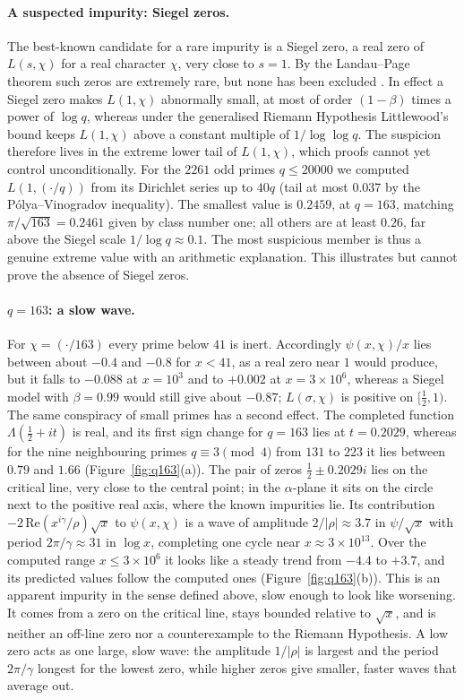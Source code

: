\documentclass[11pt,a4paper]{article}
\theoremstyle{definition}\newtheorem{definition}[proposition]{Definition}
\theoremstyle{remark}\newtheorem{remark}[proposition]{Remark}
\begin{document}
\paragraph{A suspected impurity: Siegel zeros.} The best-known candidate for a rare impurity is a Siegel zero, a real zero of $L(s,\chi)$ for a real character $\chi$, very close to $s=1$. By the Landau--Page theorem such zeros are extremely rare, but none has been excluded \cite{Davenport2000}. In effect a Siegel zero makes $L(1,\chi)$ abnormally small, at most of order $(1-\beta)$ times a power of $\log q$, whereas under the generalised Riemann Hypothesis Littlewood's bound keeps $L(1,\chi)$ above a constant multiple of $1/\log\log q$. The suspicion therefore lives in the extreme lower tail of $L(1,\chi)$, which proofs cannot yet control unconditionally. For the $2261$ odd primes $q\le20000$ we computed $L(1,(\cdot/q))$ from its Dirichlet series up to $40q$ (tail at most $0.037$ by the P\'olya--Vinogradov inequality). The smallest value is $0.2459$, at $q=163$, matching $\pi/\sqrt{163}=0.2461$ given by class number one; all others are at least $0.26$, far above the Siegel scale $1/\log q\approx0.1$. The most suspicious member is thus a genuine extreme value with an arithmetic explanation. This illustrates but cannot prove the absence of Siegel zeros.

\paragraph{$q=163$: a slow wave.} For $\chi=(\cdot/163)$ every prime below $41$ is inert. Accordingly $\psi(x,\chi)/x$ lies between about $-0.4$ and $-0.8$ for $x<41$, as a real zero near $1$ would produce, but it falls to $-0.088$ at $x=10^3$ and to $+0.002$ at $x=3\times10^6$, whereas a Siegel model with $\beta=0.99$ would still give about $-0.87$; $L(\sigma,\chi)$ is positive on $[\tfrac12,1)$. The same conspiracy of small primes has a second effect. The completed function $\Lambda(\frac12+it)$ is real, and its first sign change for $q=163$ lies at $t=0.2029$, whereas for the nine neighbouring primes $q\equiv3\pmod4$ from $131$ to $223$ it lies between $0.79$ and $1.66$ (Figure~\ref{fig:q163}(a)). The pair of zeros $\tfrac12\pm0.2029i$ lies on the critical line, very close to the central point; in the $\alpha$-plane it sits on the circle next to the positive real axis, where the known impurities lie. Its contribution $-2\,\mathrm{Re}(x^{i\gamma}/\rho)\sqrt x$ to $\psi(x,\chi)$ is a wave of amplitude $2/|\rho|\approx3.7$ in $\psi/\sqrt x$ with period $2\pi/\gamma\approx31$ in $\log x$, completing one cycle near $x\approx3\times10^{13}$. Over the computed range $x\le3\times10^6$ it looks like a steady trend from $-4.4$ to $+3.7$, and its predicted values follow the computed ones (Figure~\ref{fig:q163}(b)). This is an apparent impurity in the sense defined above, slow enough to look like worsening. It comes from a zero on the critical line, stays bounded relative to $\sqrt x$, and is neither an off-line zero nor a counterexample to the Riemann Hypothesis. A low zero acts as one large, slow wave: the amplitude $1/|\rho|$ is largest and the period $2\pi/\gamma$ longest for the lowest zero, while higher zeros give smaller, faster waves that average out.
\end{document}

